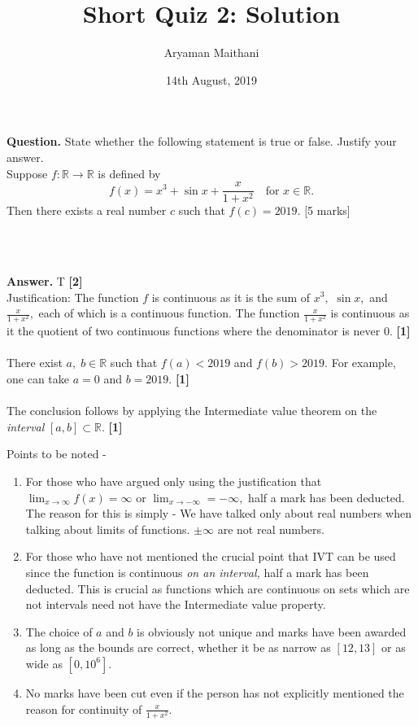 \documentclass{article}
\title{Short Quiz 2: Solution}
\author{Aryaman Maithani}
\date{14th August, 2019}
\begin{document}
\maketitle

\hrulefill

\textbf{Question.} State whether the following statement is true or false. Justify your answer.\\
Suppose $f:\mathbb{R}\to\mathbb{R}$ is defined by
\[f(x) = x^3 + \sin x + \frac{x}{1 + x^2} \quad \text{for }x \in \mathbb{R}.\]
Then there exists a real number $c$ such that $f(c) = 2019.$ \hfill [5 marks]
\begin{flushright}
	\\~\\
\end{flushright}
\textbf{Answer.} T \hfill \textbf{[2]}\\
Justification: The function $f$ is continuous as it is the sum of $x^3,$ $\sin x,$ and $\frac{x}{1+x^2},$ each of which is a continuous function. The function $\frac{x}{1 + x^2}$ is continuous as it the quotient of two continuous functions where the denominator is never $0.$ \hfill \textbf{[1]}\\~\\
%
There exist $a,\;b\in\mathbb{R}$ such that $f(a) < 2019$ and $f(b) > 2019.$ For example, one can take $a = 0$ and $b = 2019.$ \hfill \textbf{[1]}\\~\\
%
The conclusion follows by applying the Intermediate value theorem on the \emph{interval} $[a, b] \subset \mathbb{R}.$ \hfill \textbf{[1]}\\


\hrulefill

\vspace{0.2 cm}

Points to be noted -
\begin{enumerate} 
	\item For those who have argued only using the justification that $\displaystyle\lim_{x\to \infty}f(x) = \infty$ or $\displaystyle\lim_{x\to -\infty}=-\infty,$ half a mark has been deducted. The reason for this is simply - We have talked only about real numbers when talking about limits of functions. $\pm\infty$ are not real numbers.
	\item For those who have not mentioned the crucial point that IVT can be used since the function is continuous \emph{on an interval,} half a mark has been deducted. This is crucial as functions which are continuous on sets which are not intervals need not have the Intermediate value property.
	\item The choice of $a$ and $b$ is obviously not unique and marks have been awarded as long as the bounds are correct, whether it be as narrow as $[12, 13]$ or as wide as $[0, 10^6].$
	\item No marks have been cut even if the person has not explicitly mentioned the reason for continuity of $\frac{x}{1 + x^2}.$
\end{enumerate}
\end{document}
